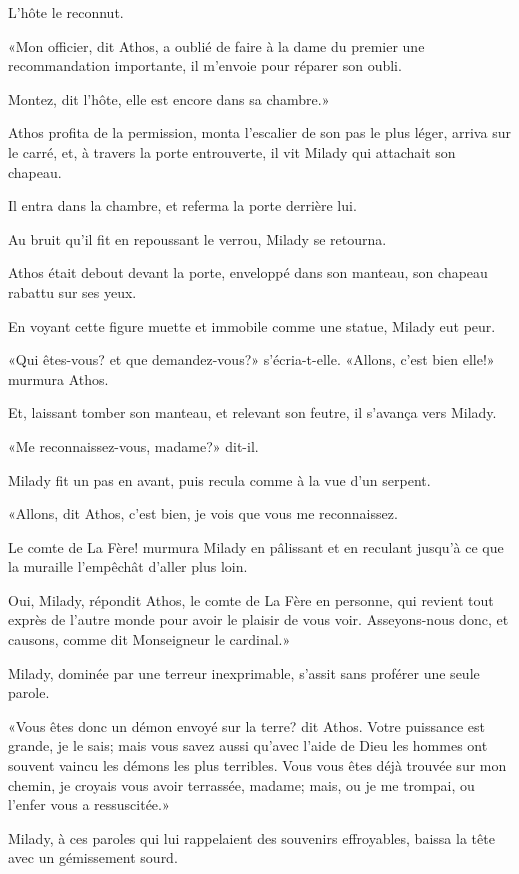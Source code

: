 L'hôte le reconnut. 

«Mon officier, dit Athos, a oublié de faire à la dame du premier une recommandation importante, il m'envoie pour réparer son oubli. 

\speak  Montez, dit l'hôte, elle est encore dans sa chambre.» 

Athos profita de la permission, monta l'escalier de son pas le plus léger, arriva sur le carré, et, à travers la porte entrouverte, il vit Milady qui attachait son chapeau. 

Il entra dans la chambre, et referma la porte derrière lui. 

Au bruit qu'il fit en repoussant le verrou, Milady se retourna. 

Athos était debout devant la porte, enveloppé dans son manteau, son chapeau rabattu sur ses yeux. 

En voyant cette figure muette et immobile comme une statue, Milady eut peur. 

«Qui êtes-vous? et que demandez-vous?» s'écria-t-elle. «Allons, c'est bien elle!» murmura Athos. 

Et, laissant tomber son manteau, et relevant son feutre, il s'avança vers Milady. 

«Me reconnaissez-vous, madame?» dit-il. 

Milady fit un pas en avant, puis recula comme à la vue d'un serpent. 

«Allons, dit Athos, c'est bien, je vois que vous me reconnaissez. 

\speak  Le comte de La Fère! murmura Milady en pâlissant et en reculant jusqu'à ce que la muraille l'empêchât d'aller plus loin. 

\speak  Oui, Milady, répondit Athos, le comte de La Fère en personne, qui revient tout exprès de l'autre monde pour avoir le plaisir de vous voir. Asseyons-nous donc, et causons, comme dit Monseigneur le cardinal.» 

Milady, dominée par une terreur inexprimable, s'assit sans proférer une seule parole. 

«Vous êtes donc un démon envoyé sur la terre? dit Athos. Votre puissance est grande, je le sais; mais vous savez aussi qu'avec l'aide de Dieu les hommes ont souvent vaincu les démons les plus terribles. Vous vous êtes déjà trouvée sur mon chemin, je croyais vous avoir terrassée, madame; mais, ou je me trompai, ou l'enfer vous a ressuscitée.» 

Milady, à ces paroles qui lui rappelaient des souvenirs effroyables, baissa la tête avec un gémissement sourd. 

